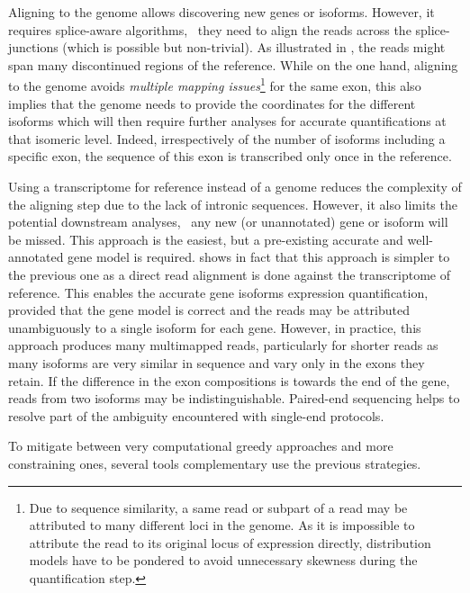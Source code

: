 Aligning to the genome allows discovering new genes or isoforms. However, it
requires splice-aware algorithms, \ie\ they need to align the
reads across the splice-junctions (which is possible but non-trivial).
As illustrated in ,
the reads might span many discontinued regions of the reference.
While on the one hand, aligning to the genome avoids \emph{multiple mapping
issues}\footnote{Due to sequence similarity, a same read or subpart of a read
may be attributed to many different loci in the genome. As it is
impossible to attribute the read to its original locus of expression directly,
distribution models have to be pondered to avoid unnecessary skewness during
the quantification step.} for the same exon, this also implies that
the genome needs to provide the coordinates for the different isoforms
which will then require further analyses for accurate quantifications at that
isomeric level.
Indeed, irrespectively of the number of isoforms including a specific exon,
the sequence of this exon is transcribed only once in the reference.\mybr\


Using a transcriptome for reference instead of a genome reduces the complexity
of the aligning step due to the lack of intronic sequences.
However, it also limits the potential downstream analyses,
\eg\ any new (or unannotated) gene or isoform will be missed.
This approach is the easiest, but a pre-existing
accurate and well-annotated gene model is required.
 shows in fact that this approach is simpler
to the previous one as a direct read alignment is done against the
transcriptome of reference.
This enables the accurate gene isoforms expression quantification,
provided that the gene model is correct and the reads may be
attributed unambiguously to a single isoform for each gene.
However, in practice, this approach produces many multimapped reads,
particularly for shorter reads as
many isoforms are very similar in sequence and vary only in the exons
they retain.
If the difference in the exon compositions is towards the end of the gene,
reads from two isoforms may be indistinguishable.
Paired-end sequencing helps to resolve part of the ambiguity encountered
with single-end protocols.\mybr\

To mitigate between very computational greedy approaches and more constraining
ones, several tools complementary use the previous strategies.\mybr\

